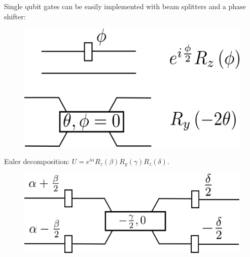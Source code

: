 \documentclass{beamer}
\begin{document}
\begin{frame}
\begin{center}

Single qubit gates can be easily implemented with beam splitters and a phase shifter:

\begin{figure}[!htb]
\centering
\includegraphics[scale=.5]{immagini/single.png}
\end{figure}

Euler decomposition: $U = e^{i \alpha} R_{z} \left( \beta \right) R_{y} \left( \gamma \right) R_{z} \left( \delta \right)$.

\begin{figure}[!htb]
\centering
\includegraphics[scale=.5]{immagini/U.png}
\end{figure}

\end{center}
\end{frame}
\end{document}
